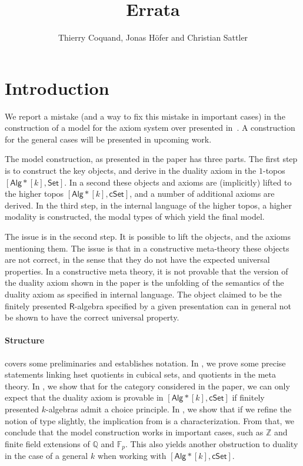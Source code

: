 \documentclass[10pt,a4paper]{article}
\theoremstyle{definition}
\theoremstyle{remark}
\newcommand{\ints}{\mathbb{Z}}
\newcommand{\rats}{\mathbb{Q}}
\newcommand{\Set}{\mathsf{Set}}
\newcommand{\cSet}{\mathsf{cSet}}
\newcommand{\Alg}{\mathsf{Alg}}
\newcommand\R{\mathsf{R}}
\begin{document}
\title{Errata}

\author{Thierry Coquand, Jonas H\"ofer and Christian Sattler}
\date{}
\maketitle


\section*{Introduction}

We report a mistake (and a way to fix this mistake in important cases) in the construction of a model for the axiom system over \HoTT{} presented in~\cite{draft}.
A construction for the general cases will be presented in upcoming work.

The model construction, as presented in the paper has three parts.
The first step is to construct the key objects, and derive in the duality axiom in the \(1\)-topos \([\Alg*[k], \Set]\).
In a second these objects and axioms are (implicitly) lifted to the higher topos \([\Alg*[k], \cSet]\), and a number of additional axioms are derived.
In the third step, in the internal language of the higher topos, a higher modality is constructed, the modal types of which yield the final model.

The issue is in the second step.
It is possible to lift the objects, and the axioms mentioning them.
The issue is that in a constructive meta-theory these objects are not correct, in the sense that they do not have the expected universal properties.
In a constructive meta theory, it is not provable that the version of the duality axiom shown in the paper is the unfolding of the semantics of the duality axiom as specified in internal language.
The object claimed to be the finitely presented \(\R\)-algebra specified by a given presentation can in general not be shown to have the correct universal property. 

\paragraph{Structure}
 covers some preliminaries and establishes notation.
In , we prove some precise statements linking hset quotients in cubical sets, and quotients in the meta theory.
In , we show that for the category considered in the paper, we can only expect that the duality axiom is provable in \([\Alg*[k], \cSet]\) if finitely presented \(k\)-algebras admit a choice principle.
In , we show that if we refine the notion of type slightly, the implication from  is a characterization.
From that, we conclude that the model construction works in important cases, such as \(\ints\) and finite field extensions of \(\rats\) and \(\mathbb{F}_p\). 
This also yields another obstruction to duality in the case of a general \(k\) when working with \([\Alg*[k], \cSet]\). 
\end{document}
